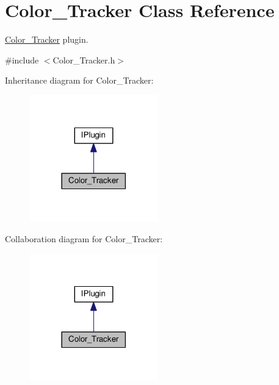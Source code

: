 \hypertarget{class_color___tracker}{}\section{Color\+\_\+\+Tracker Class Reference}
\label{class_color___tracker}


\hyperlink{class_color___tracker}{Color\+\_\+\+Tracker} plugin.  




{\ttfamily \#include $<$Color\+\_\+\+Tracker.\+h$>$}



Inheritance diagram for Color\+\_\+\+Tracker\+:\nopagebreak
\begin{figure}[H]
\begin{center}
\leavevmode
\includegraphics[width=158pt]{class_color___tracker__inherit__graph}
\end{center}
\end{figure}


Collaboration diagram for Color\+\_\+\+Tracker\+:\nopagebreak
\begin{figure}[H]
\begin{center}
\leavevmode
\includegraphics[width=158pt]{class_color___tracker__coll__graph}
\end{center}
\end{figure}

